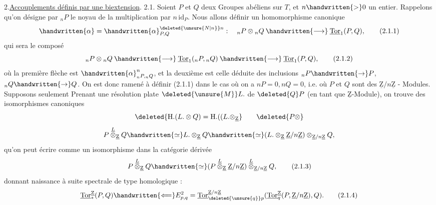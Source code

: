 2.\uline{Accouplements définis par une biextension}.
2.1. Soient $P$ et $Q$ deux Groupes abéliens sur $T$, et $n\handwritten{>}0$ un entier. Rappelons qu'on désigne par $\mathord{}_nP$ le noyau de la multiplication par $n\,\mathrm{id}_P$. Nous allons définir un homomorphisme canonique
\[ \handwritten{\alpha}=\handwritten{\alpha}^{\deleted{\unsure{N|n}}n}_{P,Q}:\quad {}_nP\otimes{}_nQ\mathbin{\handwritten{\longrightarrow}}\underline{\mathrm{Tor}}_1(P,Q),\tag*{(2.1.1)} \]
qui sera le composé
\[ {}_nP\otimes{}_nQ\mathbin{\handwritten{\longrightarrow}}\underline{\mathrm{Tor}}_1({}_nP,{}_nQ)\mathbin{\handwritten{\longrightarrow}}\underline{\mathrm{Tor}}_1(P,Q),\tag*{(2.1.2)} \]
où la première flèche est $\handwritten{\alpha}^n_{{}_nP,{}_nQ}$, et la deuxième est celle déduite des inclusions $\mathord{}_nP\handwritten{\to}P$, $\mathord{}_nQ\handwritten{\to}Q$. On est donc ramené à définir (2.1.1) dans le cas où on a $nP=0,nQ=0$, i.e. où $P$ et $Q$ sont des $\underline{\mathrm Z}/n\underline{\mathrm Z}$ - Modules.
 Supposons seulement  Prenant une résolution plate $\deleted{\unsure{M}}L\mathord.$ de $\deleted{Q}P$
(en tant que $\underline{\mathrm Z}$-Module),  on trouve des isomorphismes canoniques
\[ \deleted{\mathrm H\mathord.(L\mathord.\otimes Q)=\mathrm H\mathord.((L\mathord.\otimes_{\underline{\mathrm Z}}}\qquad\deleted{P\otimes} \]
\[ P\overset{\underline L}{\otimes}_{\underline{\mathrm Z}}Q\handwritten{\simeq}L\mathord.\otimes_{\underline{\mathrm Z}}Q\handwritten{\simeq}(L\mathord.\otimes_{\underline{\mathrm Z}}\underline{\mathrm Z}/n\underline{\mathrm Z})\otimes_{\underline{\mathrm Z}/n\underline{\mathrm Z}}Q, \]
qu'on peut écrire comme un isomorphisme dans la catégorie dérivée
\[ P\overset{\underline L}{\otimes}_{\underline{\mathrm Z}}Q\handwritten{\simeq}(P\overset{\underline L}{\otimes}_{\underline{\mathrm Z}}\underline{\mathrm Z}/n\underline{\mathrm Z})\overset{\underline L}{\otimes}_{\underline{\mathrm Z}/n\underline{\mathrm Z}}Q,\tag*{(2.1.3)} \]
donnant naissance à   suite spectrale de type homologique  : 
\[ \underline{\mathrm{Tor}}^{\underline{\mathrm Z}}_*(P,Q)\handwritten{\Longleftarrow}E^2_{p,q}=\underline{\mathrm{Tor}}^{\underline{\mathrm Z}/n\underline{\mathrm Z}}_{\deleted{\unsure{q}}p}(\underline{\mathrm{Tor}}^{\underline{\mathrm Z}}_q(P,\underline{\mathrm Z}/n\underline{\mathrm Z}),Q).\tag*{(2.1.4)} \]
